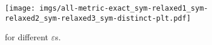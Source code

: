 \begin{figure*}[ht]
    \centering
    \texttt{[image: imgs/all-metric-exact\_sym-relaxed1\_sym-relaxed2\_sym-relaxed3\_sym-distinct-plt.pdf]}
    \caption{\relaxsym{} for different $\varepsilon$s.}
    \label{fig:diff-relax-sym-eps}
\end{figure*}